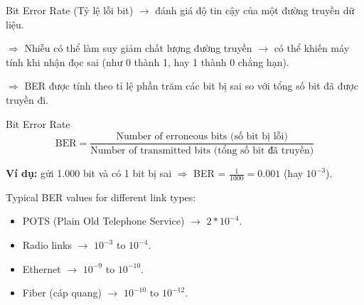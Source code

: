 \noindent
Bit Error Rate (Tỷ lệ lỗi bit) $\rightarrow$ đánh giá độ tin cậy của một đường truyền dữ liệu.

$\Rightarrow$ Nhiễu có thể làm suy giảm chất lượng đường truyền $\rightarrow$ có thể khiến máy tính khi nhận đọc sai (như 0 thành 1, hay 1 thành 0 chẳng hạn).
\medskip

\noindent
$\Rightarrow$ BER được tính theo tỉ lệ phần trăm các bit bị sai so với tổng số bit đã được truyền đi.
\medskip

\begin{mybox}{Bit Error Rate}
\begin{equation*}
    \text{BER} = \frac{\text{Number of erroneous bits (số bit bị lỗi)}}{\text{Number of transmitted bits (tổng số bit đã truyền)}}
\end{equation*}
\end{mybox}

\noindent
\textbf{Ví dụ:} gửi 1.000 bit và có 1 bit bị sai $\Rightarrow$ BER = $\frac{1}{1000} = 0.001$ (hay $10^{-3}$).

\vspace{0.5cm}

\noindent
Typical BER values for different link types:

\begin{itemize}
    \item POTS (Plain Old Telephone Service) $\rightarrow$ $2*10^{-4}$.
    \item Radio links $\rightarrow$ $10^{-3}$ to $10^{-4}$.
    \item Ethernet $\rightarrow$ $10^{-9}$ to $10^{-10}$.
    \item Fiber (cáp quang) $\rightarrow$ $10^{-10}$ to $10^{-12}$.
\end{itemize}
\medskip



